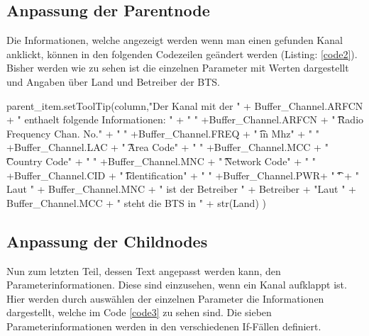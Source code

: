 \subsection*{Anpassung der Parentnode}

Die Informationen, welche angezeigt werden wenn man einen gefunden Kanal anklickt, können in den folgenden Codezeilen geändert werden (Listing: \ref{code2}). Bisher werden wie zu sehen ist die einzelnen Parameter mit Werten dargestellt und Angaben über Land und Betreiber der BTS. 

\begin{code}[firstnumber=187,numbers=left,stepnumber=1, caption={Kanalinformation},captionpos=b,label={code2}]
parent_item.setToolTip(column,"Der Kanal mit der " + Buffer_Channel.ARFCN + 
		" enthaelt folgende Informationen: \n\n"
		+ " " +Buffer_Channel.ARFCN + " \t\tAbsolute Radio Frequency Chan. No.\n"
		+ " " +Buffer_Channel.FREQ + " \t\tFrequency in Mhz\n"
		+ " " +Buffer_Channel.LAC + " \t\tLocation Area Code\n"
		+ " " +Buffer_Channel.MCC + " \t\tMobile Country Code\n" 
		+ " " +Buffer_Channel.MNC + " \t\tMobile Network Code\n"
		+ " " +Buffer_Channel.CID + " \t\tCell Identification\n"			                        
		+ " " +Buffer_Channel.PWR+ " \t\tPower\n\n\n"
		+ " Laut " + Buffer_Channel.MNC + " ist der Betreiber " + Betreiber
		+ "\n Laut " + Buffer_Channel.MCC + " steht die BTS in " + str(Land)
		)
\end{code}

\subsection*{Anpassung der  Childnodes}

Nun zum letzten Teil, dessen Text angepasst werden kann, den Parameterinformationen. Diese sind einzusehen, wenn ein Kanal aufklappt ist. Hier werden durch auswählen der einzelnen Parameter die Informationen dargestellt, welche im Code \ref{code3} zu sehen sind. Die sieben Parameterinformationen werden in den verschiedenen If-Fällen definiert. 

